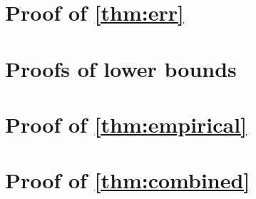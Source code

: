 \documentclass{article}
\begin{document}
\newpage

\appendix

\section{Proof of \cref{thm:err}}\label{app:upper}


\section{Proofs of lower bounds}\label{app:lower}


\section{Proof of \cref{thm:empirical}}\label{app:empirical}


\section{Proof of \cref{thm:combined}}\label{app:combined}

\end{document}
